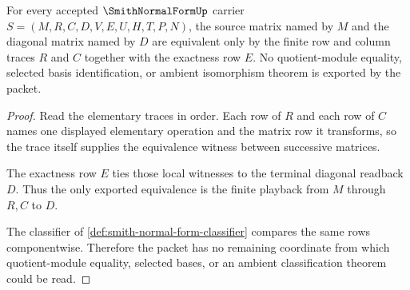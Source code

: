 \begin{theorem}
\label{thm:smith-normal-form-row-column-equivalence}
For every accepted $\SmithNormalFormUp$ carrier $S=(M,R,C,D,V,E,U,H,T,P,N)$, the source matrix named by $M$ and the diagonal matrix named by $D$ are equivalent only by the finite row and column traces $R$ and $C$ together with the exactness row $E$. No quotient-module equality, selected basis identification, or ambient isomorphism theorem is exported by the packet.
\end{theorem}
\begin{proof}
Read the elementary traces in order. Each row of $R$ and each row of $C$ names one displayed elementary operation and the matrix row it transforms, so the trace itself supplies the equivalence witness between successive matrices.

The exactness row $E$ ties those local witnesses to the terminal diagonal readback $D$. Thus the only exported equivalence is the finite playback from $M$ through $R,C$ to $D$.

The classifier of \autoref{def:smith-normal-form-classifier} compares the same rows componentwise. Therefore the packet has no remaining coordinate from which quotient-module equality, selected bases, or an ambient classification theorem could be read.
\end{proof}

